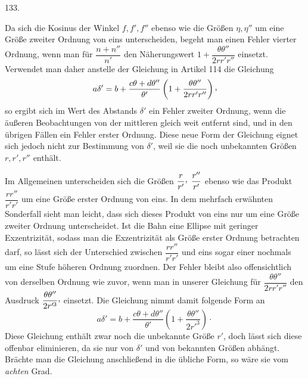 \par{}\medskip
\begin{center}\hypertarget{native-179-article133}{}133.\end{center}
Da sich die Kosinus der Winkel $f,f',f''$ ebenso wie die Größen $\eta,\eta''$ um eine Größe zweiter Ordnung
von eins unterscheiden, begeht man einen Fehler vierter Ordnung, wenn man für $\dfrac{n+n''}{n'}$ den
Näherungswert $1+\dfrac{\theta\theta''}{2rr'r''}$ einsetzt. Verwendet man daher anstelle der Gleichung in Artikel 114 die
Gleichung
\[
a\delta'=b+\frac{c\theta+d\theta''}{\theta'}\left(1+\frac{\theta\theta''}{2rr'r''}\right)\mathpunct{\raisebox{.45ex}{,}}
\]
\hypertarget{native-180}{}so ergibt sich im Wert des Abstands $\delta'$ ein Fehler zweiter Ordnung, wenn die äußeren
Beobachtungen von der mittleren gleich weit entfernt sind, und in den übrigen Fällen ein Fehler
erster Ordnung. Diese neue Form der Gleichung eignet sich jedoch nicht zur Bestimmung von $\delta'$,
weil sie die noch unbekannten Größen $r,r',r''$ enthält.
\par
Im Allgemeinen unterscheiden sich die Größen $\dfrac{r}{r'}\mathpunct{\raisebox{.45ex}{,}}\;\dfrac{r''}{r'}$ ebenso wie das Produkt $\dfrac{rr''}{r'r'}$ um eine Größe
erster Ordnung von eins. In dem mehrfach erwähnten Sonderfall sieht man leicht, dass sich dieses
Produkt von eins nur um eine Größe zweiter Ordnung unterscheidet. Ist die Bahn eine Ellipse mit
geringer Exzentrizität, sodass man die Exzentrizität als Größe erster Ordnung betrachten darf,
so lässt sich der Unterschied zwischen $\dfrac{rr''}{r'r'}$ und eins sogar einer nochmals um eine Stufe
höheren Ordnung zuordnen. Der Fehler bleibt also offensichtlich von derselben Ordnung wie zuvor,
wenn man in unserer Gleichung für $\dfrac{\theta\theta''}{2rr'r''}$ den Ausdruck $\dfrac{\theta\theta''}{2r'^3}\mathpunct{\raisebox{.45ex}{,}}$ einsetzt. Die Gleichung nimmt damit
folgende Form an
\[
a\delta'=b+\frac{c\theta+d\theta''}{\theta'}\left(1+\frac{\theta\theta''}{2r'^3}\right)\mathpunct{\cdot}
\]
Diese Gleichung enthält zwar noch die unbekannte Größe $r'$, doch lässt sich diese offenbar
eliminieren, da sie nur von $\delta'$ und von bekannten Größen abhängt. Brächte man die Gleichung
anschließend in die übliche Form, so wäre sie vom \textit{achten} Grad.
